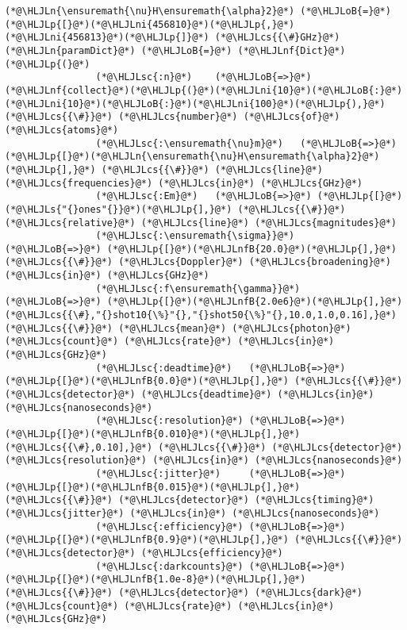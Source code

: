 \documentclass[12pt,a4paper]{article}
\newcommand{\HLJLn}[1]{#1}
\newcommand{\HLJLnf}[1]{\textcolor[RGB]{66,102,213}{#1}}
\newcommand{\HLJLs}[1]{\textcolor[RGB]{201,61,57}{#1}}
\newcommand{\HLJLsc}[1]{\textcolor[RGB]{201,61,57}{#1}}
\newcommand{\HLJLnfB}[1]{\textcolor[RGB]{59,151,46}{#1}}
\newcommand{\HLJLni}[1]{\textcolor[RGB]{59,151,46}{#1}}
\newcommand{\HLJLoB}[1]{\textcolor[RGB]{102,102,102}{\textbf{#1}}}
\newcommand{\HLJLp}[1]{#1}
\newcommand{\HLJLcs}[1]{\textcolor[RGB]{153,153,119}{\textit{#1}}}
\begin{document}
\begin{lstlisting}
(*@\HLJLn{\ensuremath{\nu}H\ensuremath{\alpha}2}@*) (*@\HLJLoB{=}@*) (*@\HLJLp{[}@*)(*@\HLJLni{456810}@*)(*@\HLJLp{,}@*)(*@\HLJLni{456813}@*)(*@\HLJLp{]}@*) (*@\HLJLcs{{\#}GHz}@*)
(*@\HLJLn{paramDict}@*) (*@\HLJLoB{=}@*) (*@\HLJLnf{Dict}@*)(*@\HLJLp{(}@*)
                (*@\HLJLsc{:n}@*)    (*@\HLJLoB{=>}@*) (*@\HLJLnf{collect}@*)(*@\HLJLp{(}@*)(*@\HLJLni{10}@*)(*@\HLJLoB{:}@*)(*@\HLJLni{10}@*)(*@\HLJLoB{:}@*)(*@\HLJLni{100}@*)(*@\HLJLp{),}@*)(*@\HLJLcs{{\#}}@*) (*@\HLJLcs{number}@*) (*@\HLJLcs{of}@*) (*@\HLJLcs{atoms}@*)
                (*@\HLJLsc{:\ensuremath{\nu}m}@*)   (*@\HLJLoB{=>}@*) (*@\HLJLp{[}@*)(*@\HLJLn{\ensuremath{\nu}H\ensuremath{\alpha}2}@*)(*@\HLJLp{],}@*) (*@\HLJLcs{{\#}}@*) (*@\HLJLcs{line}@*) (*@\HLJLcs{frequencies}@*) (*@\HLJLcs{in}@*) (*@\HLJLcs{GHz}@*)
                (*@\HLJLsc{:Em}@*)   (*@\HLJLoB{=>}@*) (*@\HLJLp{[}@*)(*@\HLJLs{"{}ones"{}}@*)(*@\HLJLp{],}@*) (*@\HLJLcs{{\#}}@*) (*@\HLJLcs{relative}@*) (*@\HLJLcs{line}@*) (*@\HLJLcs{magnitudes}@*)
                (*@\HLJLsc{:\ensuremath{\sigma}}@*)    (*@\HLJLoB{=>}@*) (*@\HLJLp{[}@*)(*@\HLJLnfB{20.0}@*)(*@\HLJLp{],}@*) (*@\HLJLcs{{\#}}@*) (*@\HLJLcs{Doppler}@*) (*@\HLJLcs{broadening}@*) (*@\HLJLcs{in}@*) (*@\HLJLcs{GHz}@*)
                (*@\HLJLsc{:f\ensuremath{\gamma}}@*)   (*@\HLJLoB{=>}@*) (*@\HLJLp{[}@*)(*@\HLJLnfB{2.0e6}@*)(*@\HLJLp{],}@*)(*@\HLJLcs{{\#},"{}shot10{\%}"{},"{}shot50{\%}"{},10.0,1.0,0.16],}@*) (*@\HLJLcs{{\#}}@*) (*@\HLJLcs{mean}@*) (*@\HLJLcs{photon}@*) (*@\HLJLcs{count}@*) (*@\HLJLcs{rate}@*) (*@\HLJLcs{in}@*) (*@\HLJLcs{GHz}@*)
                (*@\HLJLsc{:deadtime}@*)   (*@\HLJLoB{=>}@*) (*@\HLJLp{[}@*)(*@\HLJLnfB{0.0}@*)(*@\HLJLp{],}@*) (*@\HLJLcs{{\#}}@*) (*@\HLJLcs{detector}@*) (*@\HLJLcs{deadtime}@*) (*@\HLJLcs{in}@*) (*@\HLJLcs{nanoseconds}@*)
                (*@\HLJLsc{:resolution}@*) (*@\HLJLoB{=>}@*) (*@\HLJLp{[}@*)(*@\HLJLnfB{0.010}@*)(*@\HLJLp{],}@*)(*@\HLJLcs{{\#},0.10],}@*) (*@\HLJLcs{{\#}}@*) (*@\HLJLcs{detector}@*) (*@\HLJLcs{resolution}@*) (*@\HLJLcs{in}@*) (*@\HLJLcs{nanoseconds}@*)
                (*@\HLJLsc{:jitter}@*)     (*@\HLJLoB{=>}@*) (*@\HLJLp{[}@*)(*@\HLJLnfB{0.015}@*)(*@\HLJLp{],}@*) (*@\HLJLcs{{\#}}@*) (*@\HLJLcs{detector}@*) (*@\HLJLcs{timing}@*) (*@\HLJLcs{jitter}@*) (*@\HLJLcs{in}@*) (*@\HLJLcs{nanoseconds}@*) 
                (*@\HLJLsc{:efficiency}@*) (*@\HLJLoB{=>}@*) (*@\HLJLp{[}@*)(*@\HLJLnfB{0.9}@*)(*@\HLJLp{],}@*) (*@\HLJLcs{{\#}}@*) (*@\HLJLcs{detector}@*) (*@\HLJLcs{efficiency}@*)
                (*@\HLJLsc{:darkcounts}@*) (*@\HLJLoB{=>}@*) (*@\HLJLp{[}@*)(*@\HLJLnfB{1.0e-8}@*)(*@\HLJLp{],}@*) (*@\HLJLcs{{\#}}@*) (*@\HLJLcs{detector}@*) (*@\HLJLcs{dark}@*) (*@\HLJLcs{count}@*) (*@\HLJLcs{rate}@*) (*@\HLJLcs{in}@*) (*@\HLJLcs{GHz}@*)

\end{lstlisting}
\end{document}
